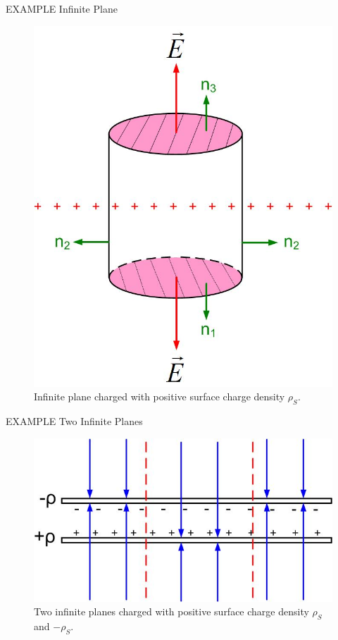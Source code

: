 \documentclass{ximera}
\begin{document}
{\large EXAMPLE} Infinite Plane


\begin{figure}[htbp]
\begin{center}
\includegraphics[scale=0.5]{../jpg/infiniteplaneofcharge.jpg}
\end{center}
\caption{Infinite plane charged with positive surface charge density $\rho_S$.}
\label{GausPlane}
\end{figure}




{\large EXAMPLE} Two Infinite Planes




\begin{figure}[htbp]
\begin{center}
\includegraphics[scale=0.5]{../jpg/infiniteparallelplates.jpg}
\end{center}
\caption{Two infinite planes charged with positive surface charge density $\rho_S$ and $-\rho_S.$}
\label{Gaus2Plane}
\end{figure}
\end{document}
